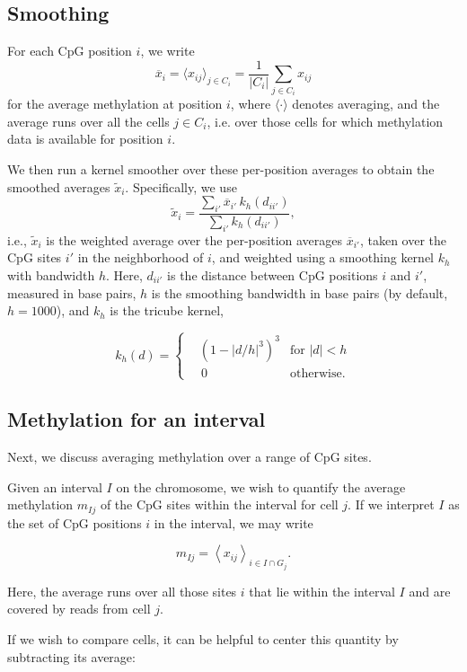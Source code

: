 \documentclass[twocolumn,10pt]{article}
\begin{document}
\subsection{Smoothing}

For each CpG position $i$, we write 
\[\overline{x}_i=\langle x_{ij} \rangle_{j\in C_i} = \frac{1}{|C_i|}\sum_{j\in C_i} x_{ij}\] 
for the average methylation at position $i$, where $\langle\cdot\rangle$ denotes averaging, and the average runs over all the cells $j\in C_i$, i.e.
over those cells for which methylation data is available for position $i$.

We then run a kernel smoother over these per-position averages to obtain the smoothed averages $\tilde x_i$.
Specifically, we use
\[ \tilde x_i = \frac{\sum_{i'} \overline x_{i'}\, k_h(d_{ii'})}{\sum_{i'} k_h(d_{ii'})},\]
i.e., $\tilde x_i$ is the weighted average over the per-position averages $\overline{x}_{i'}$, taken over the CpG sites $i'$ in the neighborhood of $i$, and weighted using a smoothing kernel $k_h$ with bandwidth $h$.
Here, $d_{ii'}$ is the distance between CpG positions $i$ and $i'$, measured in base pairs, $h$ is the smoothing bandwidth in base pairs (by default, $h=1000$), and $k_h$ is the tricube kernel,

\[ k_h(d) = \left\{
\begin{aligned}
    &\left(1-|d/h|^3\right)^3 &\text{for } |d|<h \\
    &\,0 &\text{otherwise}.
\end{aligned}
\right.
\]

\subsection{Methylation for an interval}

Next, we discuss averaging methylation over a range of CpG sites.

Given an interval $I$ on the chromosome, we wish to quantify the average methylation $m_{Ij}$ of the CpG sites within the interval for cell $j$.
If we interpret $I$ as the set of CpG positions $i$ in the interval, we may write

\[ m_{Ij} = \left< x_{ij} \right>_{i\in I\cap G_j}.\]

Here, the average runs over all those sites $i$ that lie within the interval $I$ and are covered by reads from cell $j$.

If we wish to compare cells, it can be helpful to center this quantity by subtracting its average:
\end{document}
